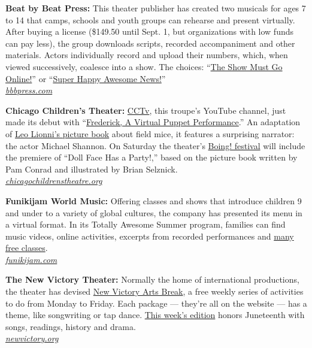 \textbf{Beat by Beat Press:} This theater publisher has created two
musicals for ages 7 to 14 that camps, schools and youth groups can
rehearse and present virtually. After buying a license (\$149.50 until
Sept. 1, but organizations with low funds can pay less), the group
downloads scripts, recorded accompaniment and other materials. Actors
individually record and upload their numbers, which, when viewed
successively, coalesce into a show. The choices:
``\href{http://www.bbbpress.com/musicals/the-show-must-go-online/}{The
Show Must Go Online!}'' or
``\href{http://www.bbbpress.com/musicals/super-happy-awesome-news/}{Super
Happy Awesome News!}''\\
\href{http://www.bbbpress.com/}{\emph{bbbpress.com}}

\textbf{Chicago Children's Theater:}
\href{https://www.youtube.com/channel/UClI9nwq0sLwmxnSC8xvN9lw}{CCTv},
this troupe's YouTube channel, just made its debut with
``\href{https://chicagochildrenstheatre.org/performance/frederick-puppet}{Frederick,
A Virtual Puppet Performance}.'' An adaptation of
\href{https://www.scholastic.com/teachers/books/frederick-by-leo-lionni/}{Leo
Lionni's picture book} about field mice, it features a surprising
narrator: the actor Michael Shannon. On Saturday the theater's
\href{https://chicagochildrenstheatre.org/boing-2020/}{Boing! festival}
will include the premiere of ``Doll Face Has a Party!,'' based on the
picture book written by Pam Conrad and illustrated by Brian Selznick.\\
\href{https://chicagochildrenstheatre.org/}{\emph{chicagochildrenstheatre.org}}

\textbf{Funikijam World Music:} Offering classes and shows that
introduce children 9 and under to a variety of global cultures, the
company has presented its menu in a virtual format. In its Totally
Awesome Summer program, families can find music videos, online
activities, excerpts from recorded performances and
\href{https://www.funikijam.com/find-a-class}{many free classes}.\\
\href{https://www.funikijam.com/}{\emph{funikijam.com}}

\textbf{The New Victory Theater:} Normally the home of international
productions, the theater has devised
\href{https://newvictory.org/stories/category/family-engagement/new-victory-arts-break/}{New
Victory Arts Break}, a free weekly series of activities to do from
Monday to Friday. Each package --- they're all on the website --- has a
theme, like songwriting or tap dance.
\href{https://www.newvictory.org/stories/new-victory-arts-break-juneteenth/}{This
week's edition} honors Juneteenth with songs, readings, history and
drama.\\
\href{https://newvictory.org/}{\emph{newvictory.org}}

